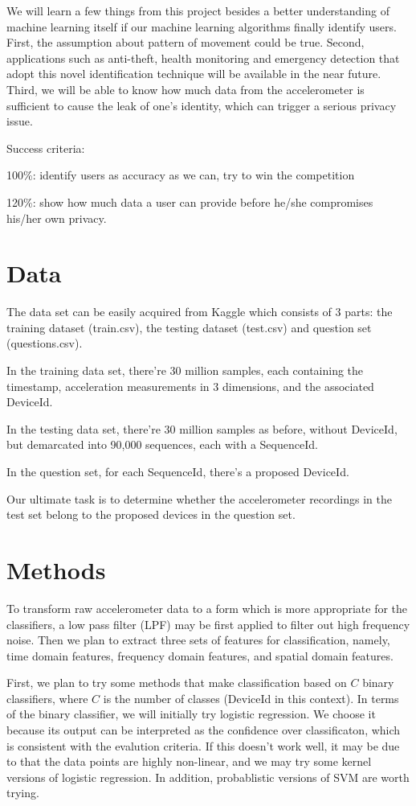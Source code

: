 \documentclass[12pt]{article}
\begin{document}
We will learn a few things from this project besides a better understanding of machine learning itself if our machine learning algorithms finally identify users. First, the assumption about pattern of movement could be true. Second, applications such as anti-theft, health monitoring and emergency detection that adopt this novel identification technique will be available in the near future. Third, we will be able to know how much data from the accelerometer is sufficient to cause the leak of one's identity, which can trigger a serious privacy issue. 

Success criteria:

100\%: identify users as accuracy as we can, try to win the competition

120\%: show how much data a user can provide before he/she compromises his/her own privacy. 

\section{Data}
The data set can be easily acquired from Kaggle which consists of 3 parts: the training dataset (train.csv), the testing dataset (test.csv) and question set (questions.csv).

In the training data set, there're 30 million samples, each containing the timestamp, acceleration measurements in 3 dimensions, and the associated DeviceId.

In the testing data set, there're 30 million samples as before, without  DeviceId, but demarcated into 90,000 sequences, each with a SequenceId.

In the question set, for each SequenceId, there's a proposed DeviceId.

Our ultimate task is to determine whether the accelerometer recordings in the test set belong to the proposed devices in the question set.


\section{Methods}
To transform raw accelerometer data to a form which is more appropriate for the classifiers, a low pass filter (LPF) may be first applied to filter out high frequency noise. Then we plan to extract three sets of features for classification, namely, time domain features, frequency domain features, and spatial domain features.

First, we plan to try some methods that make classification based on $C$ binary classifiers, where $C$ is the number of classes (DeviceId in this context). In terms of the binary classifier, we will initially try logistic regression. We choose it because its output can be interpreted as the confidence over classificaton, which is consistent with the evalution criteria. If this doesn't work well, it may be due to that the data points are highly non-linear, and we may try some kernel versions of logistic regression. In addition, probablistic versions of SVM are worth trying.
\end{document}
